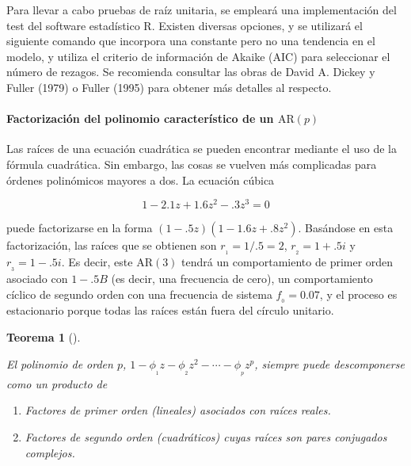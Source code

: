 \documentclass[
  us-letterpaper,
]{scrreprt}
\let\oldparagraph\paragraph
\renewcommand{\paragraph}[1]{\oldparagraph{#1}\mbox{}}
\theoremstyle{plain}
\newtheorem{theorem}{Teorema}[chapter]
\theoremstyle{definition}
\theoremstyle{definition}
\theoremstyle{plain}
\theoremstyle{remark}
\begin{document}
Para llevar a cabo pruebas de raíz unitaria, se empleará una
implementación del test del software estadístico R. Existen diversas
opciones, y se utilizará el siguiente comando que incorpora una
constante pero no una tendencia en el modelo, y utiliza el criterio de
información de Akaike (AIC) para seleccionar el número de rezagos. Se
recomienda consultar las obras de David A. Dickey y Fuller (1979) o
Fuller (1995) para obtener más detalles al respecto.

\paragraph{\texorpdfstring{Factorización del polinomio característico de
un
\(\mathrm{AR}(p)\)}{Factorización del polinomio característico de un \textbackslash mathrm\{AR\}(p)}}\label{factorizaciuxf3n-del-polinomio-caracteruxedstico-de-un-mathrmarp}

Las raíces de una ecuación cuadrática se pueden encontrar mediante el
uso de la fórmula cuadrática. Sin embargo, las cosas se vuelven más
complicadas para órdenes polinómicos mayores a dos. La ecuación cúbica

\[
1-2.1z+1.6z^2-.3z^3=0
\]

puede factorizarse en la forma \((1-.5z)(1-1.6z+.8z^2)\). Basándose en
esta factorización, las raíces que se obtienen son \(r_{_1} = 1/.5=2\),
\(r_{_2} = 1+.5i\) y \(r_{_3} = 1-.5i\). Es decir, este
\(\mathrm{AR}(3)\) tendrá un comportamiento de primer orden asociado con
\(1-.5B\) (es decir, una frecuencia de cero), un comportamiento cíclico
de segundo orden con una frecuencia de sistema \(f_{_0} = 0.07\), y el
proceso es estacionario porque todas las raíces están fuera del círculo
unitario.

\begin{theorem}[]\protect\hypertarget{thm-poli}{}\label{thm-poli}

El polinomio de orden \(p\),
\(1-\phi_{_1}z-\phi_{_2}z^2-\cdots-\phi_{_p}z^p\), siempre puede
descomponerse como un producto de

\begin{enumerate}
\def\labelenumi{\roman{enumi}.}
\item
  Factores de primer orden (lineales) asociados con raíces reales.
\item
  Factores de segundo orden (cuadráticos) cuyas raíces son pares
  conjugados complejos.
\end{enumerate}

\end{theorem}
\end{document}
